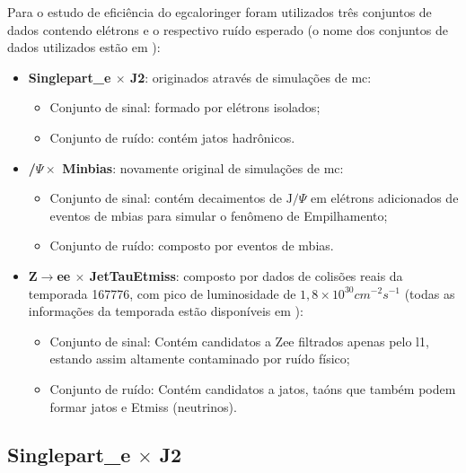 Para o estudo de eficiência do \gls{egcaloringer} foram utilizados três
conjuntos de dados contendo elétrons e o respectivo ruído esperado
(o nome dos conjuntos de dados utilizados estão em \cite{portal_caloringer}):
\begin{itemize}
\item \textbf{Singlepart\_e $\times$ J2}: originados através de simulações de
\gls{mc}:
\begin{itemize}
\item Conjunto de sinal: formado por elétrons isolados;
\item Conjunto de ruído: contém jatos hadrônicos.
\end{itemize}
\item \textbf{/$\Psi \times$ Minbias}: novamente original de simulações
de \gls{mc}:
\begin{itemize}
\item Conjunto de sinal: contém decaimentos de $\text{J}/\Psi$ em elétrons adicionados de eventos de
\gls{mbias} para simular o fenômeno de Empilhamento;
\item Conjunto de ruído: composto por eventos de \gls{mbias}.
\end{itemize}
\item \textbf{Z$\rightarrow$ee $\times$ JetTauEtmiss}: composto por dados de
colisões reais da temporada 167776, com pico de luminosidade de
$1,8\times10^{30}cm^{-2}s^{-1}$ (todas as informações da temporada estão
disponíveis em \cite{info_run}):
\begin{itemize}
\item Conjunto de sinal: Contém candidatos a Zee filtrados apenas pelo \gls{l1},
estando assim altamente contaminado por ruído físico;
\item Conjunto de ruído: Contém candidatos a jatos, taóns que também podem
formar jatos e \gls{Etmiss} (neutrinos).
\end{itemize}
\end{itemize}





\subsection{\texorpdfstring{Singlepart\_e $\times$ J2}{Singlepart\_e x J2}}
\label{ssec:single_e}

